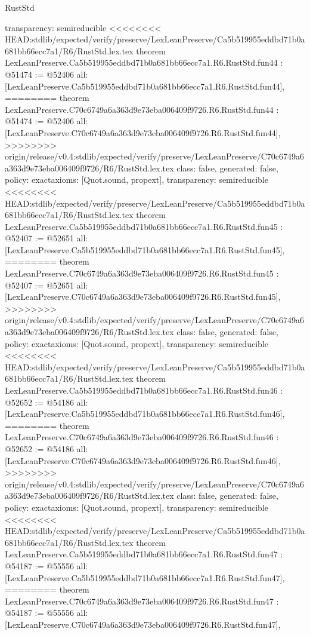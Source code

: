 \begin{lexlean}{RustStd}
\begin{coremodule}
{\begin{coremodule}
{{{{{{{{{{{{{{{{{{{{{{{{{{{{{{{{{{{{{{{{{{{{{{{  transparency: semireducible
}
<<<<<<<< HEAD:stdlib/expected/verify/preserve/LexLeanPreserve/Ca5b519955eddbd71b0a681bb66ecc7a1/R6/RustStd.lex.tex
theorem LexLeanPreserve.Ca5b519955eddbd71b0a681bb66ecc7a1.R6.RustStd.fun44 : @51474 := @52406 {
  all: [LexLeanPreserve.Ca5b519955eddbd71b0a681bb66ecc7a1.R6.RustStd.fun44],
========
theorem LexLeanPreserve.C70c6749a6a363d9e73eba006409f9726.R6.RustStd.fun44 : @51474 := @52406 {
  all: [LexLeanPreserve.C70c6749a6a363d9e73eba006409f9726.R6.RustStd.fun44],
>>>>>>>> origin/release/v0.4:stdlib/expected/verify/preserve/LexLeanPreserve/C70c6749a6a363d9e73eba006409f9726/R6/RustStd.lex.tex
  class: false,
  generated: false,
  policy: exact{axioms: [Quot.sound, propext]},
  transparency: semireducible
}
<<<<<<<< HEAD:stdlib/expected/verify/preserve/LexLeanPreserve/Ca5b519955eddbd71b0a681bb66ecc7a1/R6/RustStd.lex.tex
theorem LexLeanPreserve.Ca5b519955eddbd71b0a681bb66ecc7a1.R6.RustStd.fun45 : @52407 := @52651 {
  all: [LexLeanPreserve.Ca5b519955eddbd71b0a681bb66ecc7a1.R6.RustStd.fun45],
========
theorem LexLeanPreserve.C70c6749a6a363d9e73eba006409f9726.R6.RustStd.fun45 : @52407 := @52651 {
  all: [LexLeanPreserve.C70c6749a6a363d9e73eba006409f9726.R6.RustStd.fun45],
>>>>>>>> origin/release/v0.4:stdlib/expected/verify/preserve/LexLeanPreserve/C70c6749a6a363d9e73eba006409f9726/R6/RustStd.lex.tex
  class: false,
  generated: false,
  policy: exact{axioms: [Quot.sound, propext]},
  transparency: semireducible
}
<<<<<<<< HEAD:stdlib/expected/verify/preserve/LexLeanPreserve/Ca5b519955eddbd71b0a681bb66ecc7a1/R6/RustStd.lex.tex
theorem LexLeanPreserve.Ca5b519955eddbd71b0a681bb66ecc7a1.R6.RustStd.fun46 : @52652 := @54186 {
  all: [LexLeanPreserve.Ca5b519955eddbd71b0a681bb66ecc7a1.R6.RustStd.fun46],
========
theorem LexLeanPreserve.C70c6749a6a363d9e73eba006409f9726.R6.RustStd.fun46 : @52652 := @54186 {
  all: [LexLeanPreserve.C70c6749a6a363d9e73eba006409f9726.R6.RustStd.fun46],
>>>>>>>> origin/release/v0.4:stdlib/expected/verify/preserve/LexLeanPreserve/C70c6749a6a363d9e73eba006409f9726/R6/RustStd.lex.tex
  class: false,
  generated: false,
  policy: exact{axioms: [Quot.sound, propext]},
  transparency: semireducible
}
<<<<<<<< HEAD:stdlib/expected/verify/preserve/LexLeanPreserve/Ca5b519955eddbd71b0a681bb66ecc7a1/R6/RustStd.lex.tex
theorem LexLeanPreserve.Ca5b519955eddbd71b0a681bb66ecc7a1.R6.RustStd.fun47 : @54187 := @55556 {
  all: [LexLeanPreserve.Ca5b519955eddbd71b0a681bb66ecc7a1.R6.RustStd.fun47],
========
theorem LexLeanPreserve.C70c6749a6a363d9e73eba006409f9726.R6.RustStd.fun47 : @54187 := @55556 {
  all: [LexLeanPreserve.C70c6749a6a363d9e73eba006409f9726.R6.RustStd.fun47],
}}}}}}}}}}}}}}}}}}}}}}}}}}}}}}}}}}}}}}}}}}}}}}}}}}}
\end{coremodule}}
\end{coremodule}
\end{lexlean}
